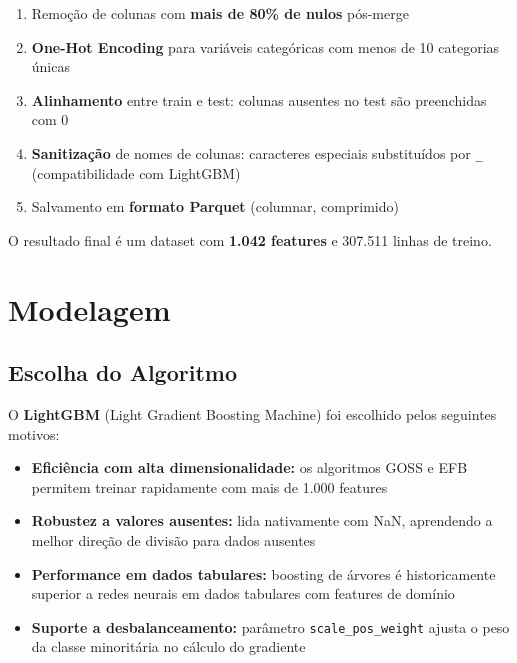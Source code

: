 \documentclass[12pt, a4paper]{article}
\begin{document}
\begin{enumerate}
    \item Remo\c{c}\~ao de colunas com \textbf{mais de 80\% de nulos} p\'os-merge
    \item \textbf{One-Hot Encoding} para vari\'aveis categ\'oricas com menos de 10
          categorias \'unicas
    \item \textbf{Alinhamento} entre train e test: colunas ausentes no test s\~ao
          preenchidas com 0
    \item \textbf{Sanitiza\c{c}\~ao} de nomes de colunas: caracteres especiais
          substitu\'idos por \texttt{\_} (compatibilidade com LightGBM)
    \item Salvamento em \textbf{formato Parquet} (columnar, comprimido)
\end{enumerate}

O resultado final \'e um dataset com \textbf{1.042 features} e 307.511 linhas de treino.

\section{Modelagem}

\subsection{Escolha do Algoritmo}

O \textbf{LightGBM} (Light Gradient Boosting Machine) foi escolhido pelos seguintes motivos:

\begin{itemize}
    \item \textbf{Efici\^encia com alta dimensionalidade:} os algoritmos GOSS e EFB
          permitem treinar rapidamente com mais de 1.000 features
    \item \textbf{Robustez a valores ausentes:} lida nativamente com NaN, aprendendo
          a melhor dire\c{c}\~ao de divis\~ao para dados ausentes
    \item \textbf{Performance em dados tabulares:} boosting de \'arvores \'e
          historicamente superior a redes neurais em dados tabulares com features
          de dom\'inio
    \item \textbf{Suporte a desbalanceamento:} par\^ametro \texttt{scale\_pos\_weight}
          ajusta o peso da classe minorit\'aria no c\'alculo do gradiente
\end{itemize}
\end{document}
